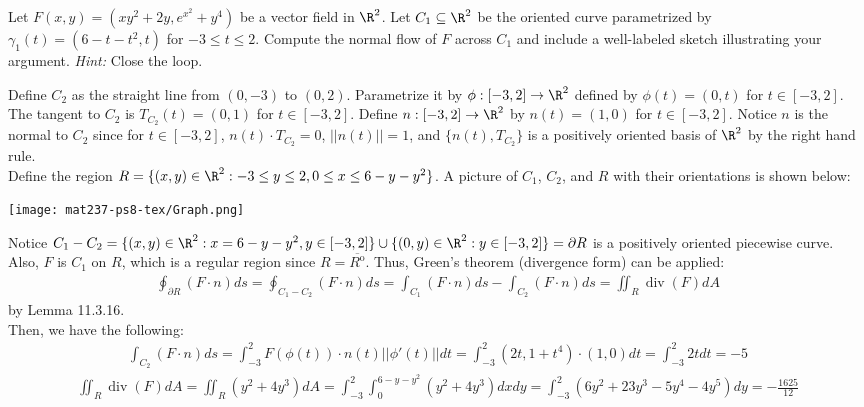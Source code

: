 \documentclass{exam}
\DeclareMathOperator{\Div}{div} %
\begin{document}
\begin{questions}

\question  Let $F(x,y) = \left( xy^2+2y, e^{x^2} + y^4   \right)$ be a vector field in $\R^2$. Let $C_1 \subseteq \R^2 $ be the oriented curve  parametrized by $\gamma_1(t) = (6-t-t^2, t)$ for $-3 \leq t \leq 2$. Compute the normal flow of $F$ across $C_1$ and include a well-labeled sketch illustrating your argument. \textit{Hint:} Close the loop. 

\begin{answer}{560pt}
Define $C_2$ as the straight line from $(0,-3)$ to $(0,2)$. Parametrize it by $\phi: [-3,2] \to \R^2$ defined by $\phi(t) = (0,t)$ for $t\in [-3,2]$. The tangent to $C_2$ is $T_{C_2}(t) = (0,1)$ for $t \in [-3,2]$. Define $n:[-3,2]\to\R^2$ by $n(t)=(1,0)$ for $t\in[-3,2]$. Notice $n$ is the normal to $C_2$ since for $t \in [-3,2]$, $n(t) \cdot T_{C_2} = 0$, $||n(t)|| = 1$, and $\{n(t), T_{C_2}\}$ is a positively oriented basis of $\R^2$ by the right hand rule.\\

Define the region $R = \{(x,y)\in\R^2: -3\leq y\leq 2,0\leq x\leq 6-y-y^2\}$. A picture of $C_1$, $C_2$, and $R$ with their orientations is shown below:

\begin{center}
    \texttt{[image: mat237-ps8-tex/Graph.png]}
\end{center}

Notice $C_1-C_2 = \{(x,y)\in\R^2:x=6-y-y^2, y\in[-3,2]\}\cup\{(0,y)\in\R^2:y\in[-3,2]\} = \partial R$ is a positively oriented piecewise curve. Also, $F$ is $C_1$ on $R$, which is a regular region since $R = \overline{R^{\mathrm{o}}}$. Thus, Green's theorem (divergence form) can be applied:
\begin{align}
\oint_{\partial R} (F\cdot n) ds = \oint_{C_1-C_2} (F\cdot n) ds = \int_{C_1} (F\cdot n) ds - \int_{C_2} (F\cdot n) ds = \iint_R \Div(F) dA
\end{align} by Lemma 11.3.16.\\

Then, we have the following:\begin{align*}\int_{C_2} (F\cdot n)ds = \int_{-3}^{2} F(\phi(t))\cdot n(t)||\phi'(t)||dt = \int_{-3}^{2} (2t,1+t^4)\cdot (1,0)dt = \int_{-3}^{2}2tdt = -5\end{align*}\begin{align*}\iint_R \Div(F)dA = \iint_R (y^2+4y^3)dA = \int_{-3}^2\int_0^{6-y-y^2} (y^2+4y^3)dxdy=\int_{-3}^2 (6y^2+23y^3-5y^4-4y^5)dy =-\frac{1625}{12}\end{align*}\\


\end{answer}
\end{questions}
\end{document}
